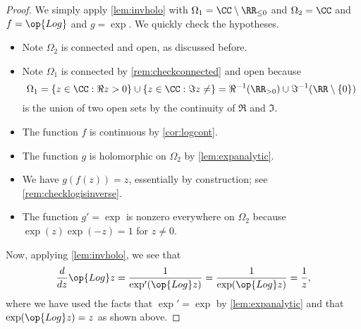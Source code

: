 \begin{proof}
	We simply apply \autoref{lem:invholo} with $\Omega_1=\CC\setminus\RR_{\le0}$ and $\Omega_2=\CC$ and $f=\op{Log}$ and $g=\exp$. We quickly check the hypotheses.
	\begin{itemize}
		\item Note $\Omega_2$ is connected and open, as discussed before.
		\item Note $\Omega_1$ is connected by \autoref{rem:checkconnected} and open because
		\[\Omega_1=\{z\in\CC:\Re z>0\}\cup\{z\in\CC:\Im z\ne\}=\Re^{-1}(\RR_{>0})\cup\Im^{-1}(\RR\setminus\{0\})\]
		is the union of two open sets by the continuity of $\Re$ and $\Im$.
		\item The function $f$ is continuous by \autoref{cor:logcont}.
		\item The function $g$ is holomorphic on $\Omega_2$ by \autoref{lem:expanalytic}.
		\item We have $g(f(z))=z$, essentially by construction; see \autoref{rem:checklogisinverse}.
		\item The function $g'=\exp$ is nonzero everywhere on $\Omega_2$ because $\exp(z)\exp(-z)=1$ for $z\ne0$.
	\end{itemize}
	Now, applying \autoref{lem:invholo}, we see that
	\[\frac d{dz}\op{Log}z=\frac1{\exp'(\op{Log}z)}=\frac1{\exp(\op{Log}z)}=\frac1z,\]
	where we have used the facts that $\exp'=\exp$ by \autoref{lem:expanalytic} and that $\exp(\op{Log}z)=z$ as shown above.
\end{proof}